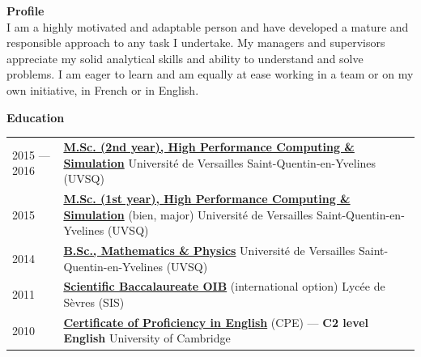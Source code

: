 \documentclass[pdftex,a4paper,10pt]{article}
\begin{document}
\begin{center}
\end{center}
\vspace{.3cm}

{\large\bf Profile}
\hrulefill\\[.3cm]
{\setlength{\extrarowheight}{.2cm}
I am a highly motivated and adaptable person and have developed
a mature and responsible approach to any task I undertake.
My managers and supervisors appreciate my solid analytical skills
and ability to understand and solve problems.
I am eager to learn and am equally at ease working in a team
or on my own initiative, in French or in English.
}
\vspace{.3cm}

{\large\bf Education}
\hrulefill\\[.3cm]
{\setlength{\extrarowheight}{.2cm}
\begin{tabularx}{\textwidth}{lX}
2015 \---- 2016 &
\href{http://mihps.prism.uvsq.fr}
{\bf M.Sc. (2nd year), High Performance Computing \& Simulation}
\newline
Université de Versailles Saint-Quentin-en-Yvelines (UVSQ) \\
2015 &
\href{http://mihps.prism.uvsq.fr}
{\bf M.Sc. (1st year), High Performance Computing \& Simulation}
(bien, major)
\newline
Université de Versailles Saint-Quentin-en-Yvelines (UVSQ) \\
2014 &
\href{http://www.uvsq.fr/double-licence-mathematiques-et-physique-343617.kjsp}
{\bf B.Sc., Mathematics \& Physics}
\newline
Université de Versailles Saint-Quentin-en-Yvelines (UVSQ) \\
2011 &
\href{http://www.education.gouv.fr/cid20999/l-option-internationale-du-baccalaureat-o.i.b.html}
{\bf Scientific Baccalaureate OIB} (international option)
\newline
Lycée de Sèvres (SIS) \\
2010 &
\href{http://www.cambridgeenglish.org/exams/proficiency/}
{\bf Certificate of Proficiency in English} (CPE)
\---- {\bf C2 level English}
\newline
University of Cambridge
\end{tabularx}}
\vspace{.3cm}
\end{document}
